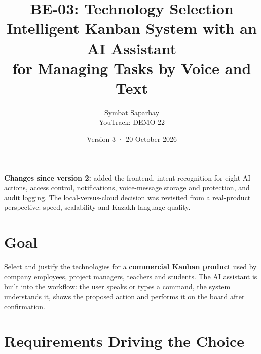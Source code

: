 \documentclass[11pt,a4paper]{article}
\title{\textbf{BE-03: Technology Selection}\\[4pt]
\large Intelligent Kanban System with an AI Assistant\\ for Managing Tasks by Voice and Text}
\author{Symbat Saparbay\\ \small YouTrack: DEMO-22}
\date{Version 3 · 20 October 2026}
\begin{document}
\maketitle

\begin{center}
\begin{minipage}{0.9\textwidth}
\small
\textbf{Changes since version 2:} added the frontend, intent recognition for eight AI actions, access control, notifications, voice-message storage and protection, and audit logging. The local-versus-cloud decision was revisited from a real-product perspective: speed, scalability and Kazakh language quality.
\end{minipage}
\end{center}

\tableofcontents
\newpage

\section{Goal}

Select and justify the technologies for a \textbf{commercial Kanban product} used by company employees, project managers, teachers and students. The AI assistant is built into the workflow: the user speaks or types a command, the system understands it, shows the proposed action and performs it on the board after confirmation.

\section{Requirements Driving the Choice}
\end{document}
